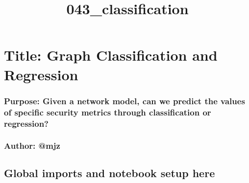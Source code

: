 \documentclass[11pt]{article}
\title{043\_classification}
\makeatletter
\newcommand{\boxspacing}{\kern\kvtcb@left@rule\kern\kvtcb@boxsep}
\newcommand{\prompt}[4]{
        \ttfamily\llap{{\color{#2}[#3]:\hspace{3pt}#4}}\vspace{-\baselineskip}
    }
\makeatother
\begin{document}
    
    \maketitle
    
    

    
    \section{Title: Graph Classification and
Regression}\label{title-graph-classification-and-regression}

\subsubsection{Purpose: Given a network model, can we predict the values
of specific security metrics through classification or
regression?}\label{purpose-given-a-network-model-can-we-predict-the-values-of-specific-security-metrics-through-classification-or-regression}

\subsubsection{Author: @mjz}\label{author-mjz}

    \subsection{Global imports and notebook setup
here}\label{global-imports-and-notebook-setup-here}

    \begin{tcolorbox}[breakable, size=fbox, boxrule=1pt, pad at break*=1mm,colback=cellbackground, colframe=cellborder]
\prompt{In}{incolor}{ }{\boxspacing}
\begin{Verbatim}[commandchars=\\\{\}]

\end{Verbatim}
\end{tcolorbox}
\end{document}
